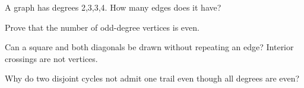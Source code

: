 \documentclass[11pt]{article}
\begin{document}
A graph has degrees 2,3,3,4. How many edges does it have?\par
\vspace{5pt}
Prove that the number of odd-degree vertices is even.\par
\vspace{5pt}
Can a square and both diagonals be drawn without repeating an edge? Interior crossings are not vertices.\par
\vspace{5pt}
Why do two disjoint cycles not admit one trail even though all degrees are even?\par
\vspace{5pt}
\end{document}
